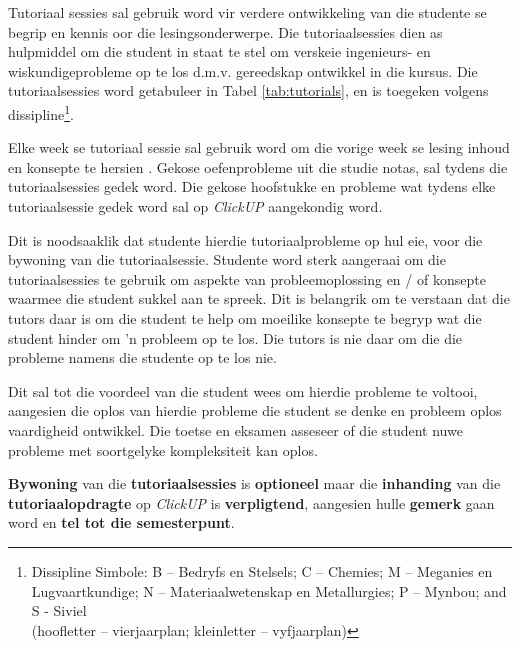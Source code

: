         Tutoriaal sessies sal gebruik word vir verdere ontwikkeling van die
        studente se begrip en kennis oor die lesingsonderwerpe.  Die
        tutoriaalsessies dien as hulpmiddel om die student in staat te stel om
        verskeie ingenieurs- en wiskundigeprobleme op te los d.m.v. gereedskap
        ontwikkel in die kursus. Die tutoriaalsessies word getabuleer in Tabel
        \ref{tab:tutorials}, en is toegeken volgens
        dissipline\footnote{Dissipline Simbole:
            B -- Bedryfs en Stelsels;
            C -- Chemies;
            M -- Meganies en Lugvaartkundige;
            N -- Materiaalwetenskap en Metallurgies;
            P -- Mynbou; and S - Siviel \\
            (hoofletter -- vierjaarplan; kleinletter -- vyfjaarplan)}.

        Elke week se tutoriaal sessie sal gebruik word om die vorige week se
        lesing inhoud en konsepte te hersien . Gekose oefenprobleme uit die
        studie notas, sal tydens die tutoriaalsessies gedek word. Die gekose
        hoofstukke en probleme wat tydens elke tutoriaalsessie gedek word sal
        op {\it ClickUP} aangekondig word.

        Dit is noodsaaklik dat studente hierdie tutoriaalprobleme op hul eie,
        voor die bywoning van die tutoriaalsessie. Studente word sterk
        aangeraai om die tutoriaalsessies te gebruik om aspekte van
        probleemoplossing en / of konsepte waarmee die student sukkel aan te
        spreek. Dit is belangrik om te verstaan dat die tutors daar is om die
        student te help om moeilike konsepte te begryp wat die student hinder
        om 'n probleem op te los. Die tutors is nie daar om die die probleme
        namens die studente op te los nie.

        Dit sal tot die voordeel van die student wees om hierdie probleme te
        voltooi, aangesien die oplos van hierdie probleme die student se denke
        en probleem oplos vaardigheid ontwikkel.  Die toetse en eksamen
        asseseer of die student nuwe probleme met soortgelyke kompleksiteit kan
        oplos.

        \textbf{Bywoning} van die \textbf{tutoriaalsessies} is
        \textbf{optioneel} maar die \textbf{inhanding} van die
        \textbf{tutoriaalopdragte} op {\it ClickUP} is \textbf{verpligtend},
        aangesien hulle \textbf{gemerk} gaan word en \textbf{tel tot die
        semesterpunt}.
